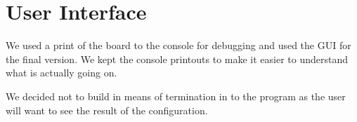 \section{User Interface}

We used a print of the board to the console for debugging and used the GUI for the final version. We kept the console printouts to make it easier to understand what is actually going on. 
 
We decided not to build in means of termination in to the program as the user will want to see the result of the configuration.


